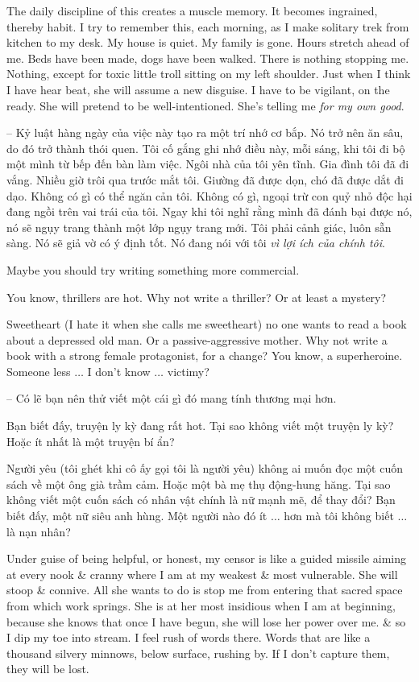 \documentclass{article}
\begin{document}
\begin{itemize}
	The daily discipline of this creates a muscle memory. It becomes ingrained, thereby habit. I try to remember this, each morning, as I make solitary trek from kitchen to my desk. My house is quiet.  My family is gone. Hours stretch ahead of me. Beds have been made, dogs have been walked. There is nothing stopping me. Nothing, except for toxic little troll sitting on my left shoulder. Just when I think I have hear beat, she will assume a new disguise. I have to  be vigilant, on the ready. She will pretend to be well-intentioned. She's telling me {\it for my own good}.
	
	-- Kỷ luật hàng ngày của việc này tạo ra một trí nhớ cơ bắp. Nó trở nên ăn sâu, do đó trở thành thói quen. Tôi cố gắng ghi nhớ điều này, mỗi sáng, khi tôi đi bộ một mình từ bếp đến bàn làm việc. Ngôi nhà của tôi yên tĩnh. Gia đình tôi đã đi vắng. Nhiều giờ trôi qua trước mắt tôi. Giường đã được dọn, chó đã được dắt đi dạo. Không có gì có thể ngăn cản tôi. Không có gì, ngoại trừ con quỷ nhỏ độc hại đang ngồi trên vai trái của tôi. Ngay khi tôi nghĩ rằng mình đã đánh bại được nó, nó sẽ ngụy trang thành một lớp ngụy trang mới. Tôi phải cảnh giác, luôn sẵn sàng. Nó sẽ giả vờ có ý định tốt. Nó đang nói với tôi {\it vì lợi ích của chính tôi}.
	
	Maybe you should try writing something more commercial.
	
	You know, thrillers are hot. Why not write a thriller? Or at least a mystery?
	
	Sweetheart (I hate it when she calls me sweetheart) no one wants to read a book about a depressed old man. Or a passive-aggressive mother. Why not write a book with a strong female protagonist, for a change? You know, a superheroine. Someone less $\ldots$ I don't know $\ldots$ victimy?
	
	-- Có lẽ bạn nên thử viết một cái gì đó mang tính thương mại hơn.
	
	Bạn biết đấy, truyện ly kỳ đang rất hot. Tại sao không viết một truyện ly kỳ? Hoặc ít nhất là một truyện bí ẩn?
	
	Người yêu (tôi ghét khi cô ấy gọi tôi là người yêu) không ai muốn đọc một cuốn sách về một ông già trầm cảm. Hoặc một bà mẹ thụ động-hung hăng. Tại sao không viết một cuốn sách có nhân vật chính là nữ mạnh mẽ, để thay đổi? Bạn biết đấy, một nữ siêu anh hùng. Một người nào đó ít $\ldots$ hơn mà tôi không biết $\ldots$ là nạn nhân?
	
	Under guise of being helpful, or honest, my censor is like a guided missile aiming at every nook \& cranny where I am at my weakest \& most vulnerable. She will stoop \& connive. All she wants to do is stop me from entering that sacred space from which work springs. She is at her most insidious when I am at beginning, because she knows that once I have begun, she will lose her power over me. \& so I dip my toe into stream. I feel rush of words there. Words that are like a thousand silvery minnows, below surface, rushing by. If I don't capture them, they will be lost.
	

\end{itemize}
\end{document}
